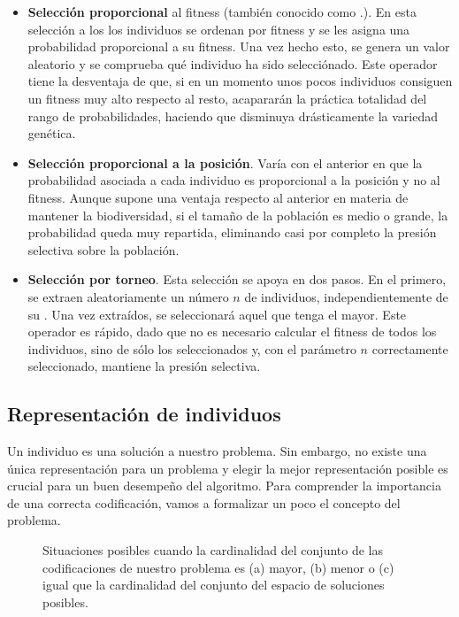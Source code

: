 \begin{itemize}
	\item \textbf{Selección proporcional} al fitness (también conocido como \textbf{}.). En esta selección a los los individuos se ordenan por fitness y se les asigna una probabilidad proporcional a su fitness. Una vez hecho esto, se genera un valor aleatorio y se comprueba qué individuo ha sido selecciónado. Este operador tiene la desventaja de que, si en un momento unos pocos individuos consiguen un fitness muy alto respecto al resto, acapararán la práctica totalidad del rango de probabilidades, haciendo que disminuya drásticamente la variedad genética.
	\item \textbf{Selección proporcional a la posición}. Varía con el anterior en que la probabilidad asociada a cada individuo es proporcional a la posición y no al fitness. Aunque supone una ventaja respecto al anterior en materia de mantener la biodiversidad, si el tamaño de la población es medio o grande, la probabilidad queda muy repartida, eliminando casi por completo la presión selectiva sobre la población.
	\item \textbf{Selección por torneo}. Esta selección se apoya en dos pasos. En el primero, se extraen aleatoriamente un número $n$ de individuos, independientemente de su \textit{}. Una vez extraídos, se seleccionará aquel que tenga el \textit{} mayor. Este operador es rápido, dado que no es necesario calcular el fitness de todos los individuos, sino de sólo los seleccionados y, con el parámetro $n$ correctamente seleccionado, mantiene la presión selectiva.
\end{itemize}

\subsection{Representación de individuos}

Un individuo es una solución a nuestro problema. Sin embargo, no existe una única representación para un problema y elegir la mejor representación posible es crucial para un buen desempeño del algoritmo. Para comprender la importancia de una correcta codificación, vamos a formalizar un poco el concepto del problema.

\begin{figure}
	\caption[Diferentes situaciones en función de la cardinalidad de los conjuntos de codificaciones y soluciones]{Situaciones posibles cuando la cardinalidad del conjunto de las codificaciones de nuestro problema es (a) mayor, (b) menor o (c) igual que la cardinalidad del conjunto del espacio de soluciones posibles.}
	\label{fig:why-we-need-a-correct-codification}
\end{figure}

